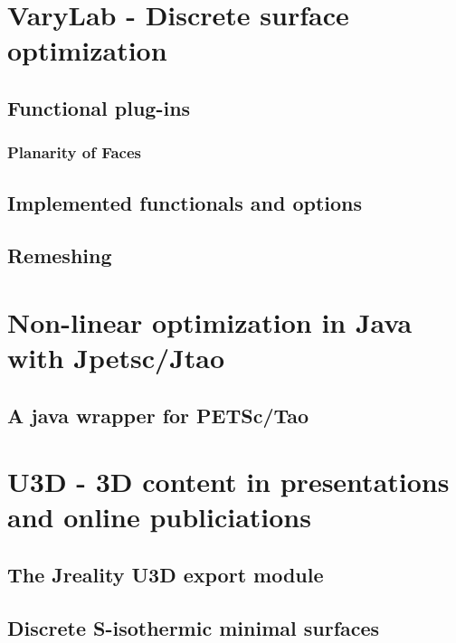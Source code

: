 \documentclass[Thesis.tex]{subfiles}
\begin{document}
\chapter{{\sc VaryLab} - Discrete surface optimization}
\label{sec:varylab}



\section{Functional plug-ins}

\subsection{Planarity of Faces}



\section{Implemented functionals and options}
\section{Remeshing}

\chapter{Non-linear optimization in {\sc Java} with {\sc Jpetsc/Jtao}}
\label{sec:jpetsctao}

\section{A java wrapper for {\sc PETSc/Tao}}

\chapter{{\sc U3D} - 3D content in presentations and online publiciations}
\label{sec:u3d}
\section{The {\sc Jreality} U3D export module}
\section{Discrete S-isothermic minimal surfaces}

\subfilebibliography
\end{document}
